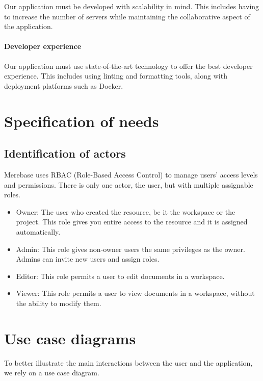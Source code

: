 Our application must be developed with scalability in mind.
This includes having to increase the number of servers while maintaining the collaborative aspect of the application.

\paragraph{Developer experience}

Our application must use state-of-the-art technology to offer the best developer experience.
This includes using linting and formatting tools, along with deployment platforms such as Docker.

\section{Specification of needs}
\subsection{Identification of actors}

Merebase uses RBAC (Role-Based Access Control) to manage users' access
levels and permissions.
There is only one actor, the user, but with
multiple assignable roles.

\begin{itemize}
	\item
	      Owner: The user who created the resource, be it the workspace or the
	      project.
	      This role gives you entire access to the resource and it is
	      assigned automatically.
	\item
	      Admin: This role gives non-owner users the same privileges as the
	      owner.
	      Admins can invite new users and assign roles.
	\item
	      Editor: This role permits a user to edit documents in a workspace.
	\item
	      Viewer: This role permits a user to view documents in a workspace,
	      without the ability to modify them.
\end{itemize}

\section{Use case diagrams}

To better illustrate the main interactions between the user and the
application, we rely on a use case diagram.



